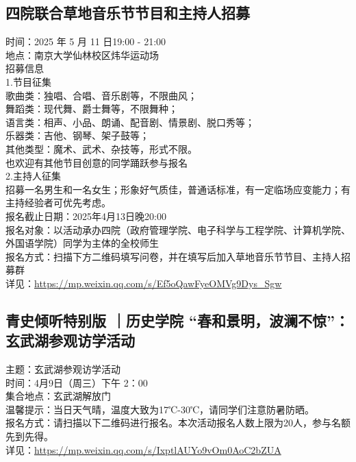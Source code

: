 \documentclass[letterpaper, 12pt]{article}
\begin{document}
\begin{multicols}{2}
\subsection{四院联合草地音乐节节目和主持人招募}
时间：2025 年 5 月 11 日19:00 - 21:00
\\地点：南京大学仙林校区炜华运动场
\\招募信息
\\1.节目征集
\\歌曲类：独唱、合唱、音乐剧等，不限曲风；
\\舞蹈类：现代舞、爵士舞等，不限舞种；
\\语言类：相声、小品、朗诵、配音剧、情景剧、脱口秀等；
\\乐器类：吉他、钢琴、架子鼓等；
\\其他类型：魔术、武术、杂技等，形式不限。
\\也欢迎有其他节目创意的同学踊跃参与报名
\\2.主持人征集
\\招募一名男生和一名女生；形象好气质佳，普通话标准，有一定临场应变能力；有主持经验者可优先考虑。
\\报名截止日期：2025年4月13日晚20:00
\\报名对象：以活动承办四院（政府管理学院、电子科学与工程学院、计算机学院、外国语学院）同学为主体的全校师生
\\报名方式：扫描下方二维码填写问卷，并在填写后加入草地音乐节节目、主持人招募群
\\详见：\url{https://mp.weixin.qq.com/s/Ef5oQawFyeOMVg9Dys_Sgw}

\subsection{青史倾听特别版 ｜历史学院 “春和景明，波澜不惊”：玄武湖参观访学活动}
主题：玄武湖参观访学活动
\\时间：4月9日（周三）下午 2：00
\\集合地点：玄武湖解放门
\\温馨提示：当日天气晴，温度大致为17℃-30℃，请同学们注意防暑防晒。
\\报名方式：请扫描以下二维码进行报名。本次活动报名人数上限为20人，参与名额先到先得。
\\详见：\url{https://mp.weixin.qq.com/s/IxptlAUYo9vOm0AoC2bZUA}


\end{multicols}
\end{document}
